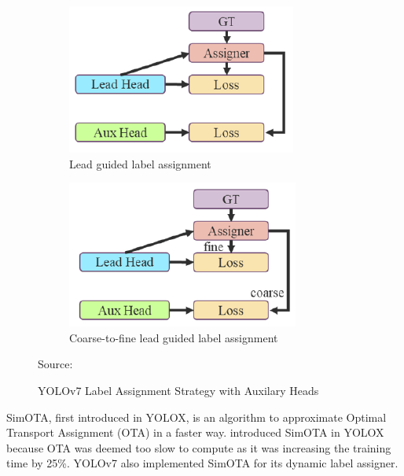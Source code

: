 \begin{figure}[H]
      \begin{subfigure}[][][t]{0.4\textwidth}
        \includegraphics[width=1\linewidth]{figures/lead-head-assigner.png}
        \caption{Lead guided label assignment}
        \label{fig:lead-head}
      \end{subfigure}\hfill
      \begin{subfigure}[][][t]{0.4\textwidth}
        \includegraphics[width=1\linewidth]{figures/coarse-to-fine.png}
        \caption{Coarse-to-fine lead guided label assignment}
        \label{fig:coarse-to-fine}
      \end{subfigure}
      \caption*{Source: \textcite{yolov7}}
      \caption{YOLOv7 Label Assignment Strategy with Auxilary Heads}
      \label{fig:labelassigner}
  \end{figure}
  SimOTA, first introduced in YOLOX, is an algorithm to approximate Optimal Transport Assignment (OTA)
  in a faster way. \textcite{yolox} introduced SimOTA in YOLOX because OTA was deemed too slow to compute
  as it was increasing the training time by 25\%. YOLOv7 also implemented SimOTA for its dynamic label assigner.


